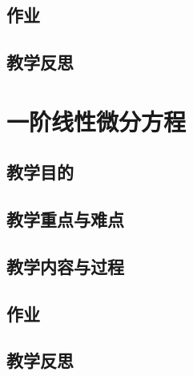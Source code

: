 \documentclass[a4paper, titlepage, twoside]{article}
\numberwithin{equation}{section}
\begin{document}
\subsection{作业}
\subsection{教学反思}






\section{一阶线性微分方程}
\subsection{教学目的}
\subsection{教学重点与难点}
\subsection{教学内容与过程}
\subsection{作业}
\subsection{教学反思}
\end{document}
